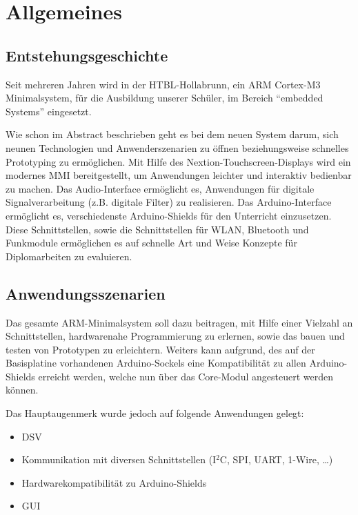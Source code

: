 \newcommand*{\IIC}{I$^2$C}

\section{Allgemeines}
\label{sec:allgemeines}

\subsection{Entstehungsgeschichte}
\label{sec:entstehungsgeschichte}

Seit mehreren Jahren wird in der HTBL-Hollabrunn, ein \gls{ARM} Cortex-M3 \gls{Minimalsystem}, für die Ausbildung unserer Schüler, im Bereich \enquote{embedded Systems} eingesetzt.

Wie schon im Abstract beschrieben geht es bei dem neuen System darum, sich neunen Technologien und Anwenderszenarien zu öffnen beziehungsweise schnelles Prototyping zu ermöglichen. Mit Hilfe des Nextion-Touchscreen-Displays wird ein modernes \gls{MMI} bereitgestellt, um Anwendungen leichter und interaktiv bedienbar zu machen. Das Audio-Interface ermöglicht es, Anwendungen für digitale Signalverarbeitung (z.B. digitale Filter) zu realisieren. Das Arduino-Interface ermöglicht es, verschiedenste Arduino-Shields für den Unterricht einzusetzen. Diese Schnittstellen, sowie die Schnittstellen für WLAN, Bluetooth und Funkmodule ermöglichen es auf schnelle Art und Weise Konzepte für Diplomarbeiten zu evaluieren.

\subsection{Anwendungsszenarien}
\label{sec:anwendungsszenarien}

Das gesamte \gls{ARM}-\gls{Minimalsystem} soll dazu beitragen, mit Hilfe einer Vielzahl an Schnittstellen, hardwarenahe Programmierung zu erlernen, sowie das bauen und testen von Prototypen zu erleichtern. Weiters kann aufgrund, des auf der \gls{Basisplatine} vorhandenen Arduino-Sockels eine Kompatibilität zu allen Arduino-Shields erreicht werden, welche nun über das \gls{Core-Modul} angesteuert werden können.

Das Hauptaugenmerk wurde jedoch auf folgende Anwendungen gelegt:

\begin{itemize}
    \item \gls{DSV}
    \item Kommunikation mit diversen Schnittstellen (\IIC{}, SPI, UART, 1-Wire, \dots{})
    \item Hardwarekompatibilität zu Arduino-Shields
    \item \gls{GUI}
\end{itemize}


